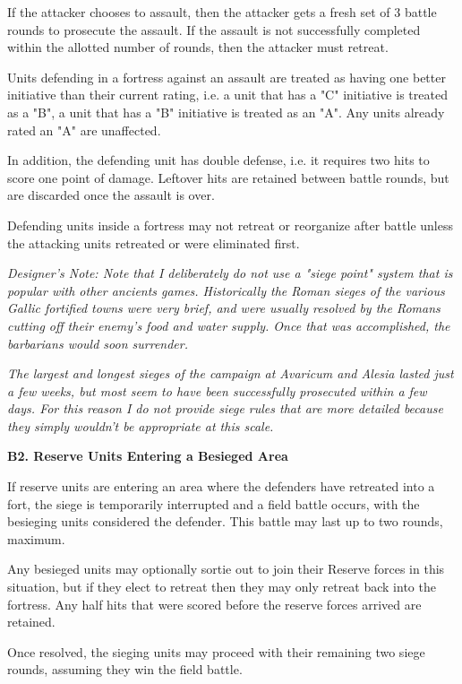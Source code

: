 If the attacker chooses to assault, then the attacker gets a fresh set of 3 battle rounds to prosecute the assault. If the assault is not successfully completed within the allotted number of rounds, then the attacker must retreat.

Units defending in a fortress against an assault are treated as having one better initiative than their current rating, i.e. a unit that has a "C" initiative is treated as a "B", a unit that has a "B" initiative is treated as an "A". Any units already rated an "A" are unaffected.

In addition, the defending unit has double defense, i.e. it requires two hits to score one point of damage. Leftover hits are retained between battle rounds, but are discarded once the assault is over.

Defending units inside a fortress may not retreat or reorganize after battle unless the attacking units retreated or were eliminated first.


\textit{Designer's Note: Note that I deliberately do not use a "siege point" system that is popular with other ancients games. Historically the Roman sieges of the various Gallic fortified towns were very brief, and were usually resolved by the Romans cutting off their enemy's food and water supply. Once that was accomplished, the barbarians would soon surrender.}

\textit{The largest and longest sieges of the campaign at Avaricum and Alesia lasted just a few weeks, but most seem to have been successfully prosecuted within a few days. For this reason I do not provide siege rules that are more detailed because they simply wouldn't be appropriate at this scale.}

\textbf{B2. Reserve Units Entering a Besieged Area}

If reserve units are entering an area where the defenders have retreated into a fort, the siege is temporarily interrupted and a field battle occurs, with the besieging units considered the defender. This battle may last up to two rounds, maximum. 

Any besieged units may optionally sortie out to join their Reserve forces in this situation, but if they elect to retreat then they may only retreat back into the fortress. Any half hits that were scored before the reserve forces arrived are retained.

Once resolved, the sieging units may proceed with their remaining two siege rounds, assuming they win the field battle.

